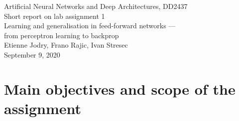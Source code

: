 \documentclass[a4paper]{article}
\begin{document}
\begin{center}
  {\large Artificial Neural Networks and Deep Architectures, DD2437}\\
  \vspace{7mm}
  {\huge Short report on lab assignment 1\\[1ex]}
  {\Large Learning and generalisation in feed-forward networks ---\\[1ex]
 from perceptron learning to backprop}\\
  \vspace{8mm}  
  {\Large Etienne Jodry, Frano Rajic, Ivan Stresec\\}
  \vspace{4mm}
  {\large September 9, 2020\\}
\end{center}


\section{Main objectives and scope of the assignment}
\end{document}
